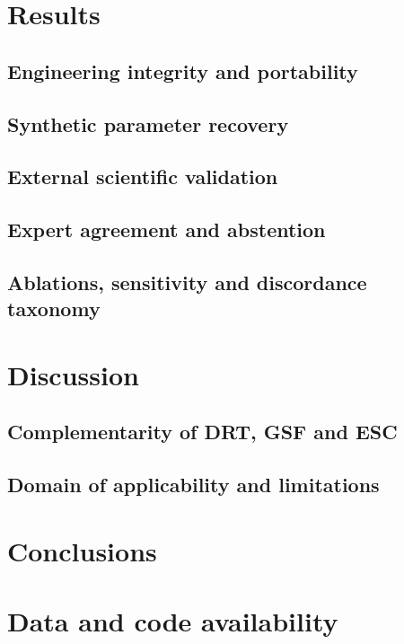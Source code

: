 \documentclass[a4paper,fleqn]{cas-sc}
\begin{document}
\section{Results}\label{sec:results}


\subsection{Engineering integrity and portability}

\subsection{Synthetic parameter recovery}

\subsection{External scientific validation}

\subsection{Expert agreement and abstention}

\subsection{Ablations, sensitivity and discordance taxonomy}

\section{Discussion}\label{sec:discussion}

\subsection{Complementarity of DRT, GSF and ESC}

\subsection{Domain of applicability and limitations}

\section{Conclusions}\label{sec:conclusions}

\section*{Data and code availability}
\end{document}
